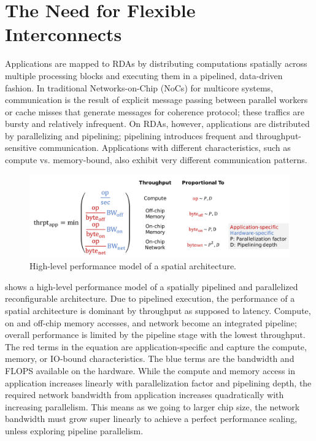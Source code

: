 \section{The Need for Flexible Interconnects}
Applications are mapped to RDAs by distributing computations spatially across multiple processing
blocks and executing them in a pipelined, data-driven fashion. 
In traditional Networks-on-Chip
(NoCs) for multicore systems, communication is the result of explicit message passing between
parallel workers or cache misses that generate messages for coherence protocol; these traffics are bursty and
relatively infrequent. 
On RDAs, however, applications are distributed by parallelizing and pipelining; 
pipelining introduces frequent and throughput-sensitive communication. 
Applications with different characteristics, such as compute vs. memory-bound, also exhibit 
very different communication patterns.

\begin{figure}
\centering
\includegraphics[width=1\textwidth]{figs/perfmodel.pdf}
\caption[High-level performance model of a spatial architecture]{
High-level performance model of a spatial architecture. 
}
\label{fig:perfmodel}
\end{figure}

 shows a high-level performance model of a spatially pipelined and parallelized
reconfigurable architecture.
Due to pipelined execution, the performance of a spatial architecture is dominant by throughput as
supposed to latency. 
Compute, on and off-chip memory accesses, and network become an integrated pipeline;
overall performance is limited by the pipeline stage with the lowest throughput.
The red terms in the equation are application-specific and capture the compute, memory, or IO-bound characteristics.
The blue terms are the bandwidth and FLOPS available on the hardware.
While the compute and memory access in application increases linearly with parallelization factor and pipelining depth,
the required network bandwidth from application increases quadratically with increasing parallelism.
This means as we going to larger chip size, the network bandwidth must grow super linearly to achieve a perfect performance scaling, unless exploring pipeline parallelism.

